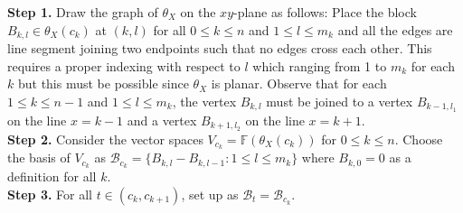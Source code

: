 \documentclass[a4paper,12pt]{article}
\newcommand{\no}{\noindent\textbf}
\begin{document}
\no{Step 1.} Draw the graph of $\theta_X$ on the $xy$-plane as follows: Place the block $B_{k,l}\in \theta_X(c_k)$ at $(k,l)$ for all $0\leq k \leq n$ and $1 \leq l \leq m_k$ and all the edges are line segment joining two endpoints such that no edges  cross each other. This requires a proper indexing with respect to $l$ which ranging from 1 to $m_k$ for each $k$ but this must be possible since $\theta_X$ is planar. Observe that for each $1\leq k\leq n-1$ and $1\leq l \leq m_k$, the vertex $B_{k,l}$ must be joined to a vertex $B_{k-1, l_1}$ on the line $x=k-1$ and a vertex $B_{k+1, l_2}$ on the line $x=k+1$.\\

\no{Step 2.} Consider the vector spaces $V_{c_k}=\mathbb{F}(\theta_X(c_k))$ for $0\leq k \leq n$. Choose the basis of $V_{c_k}$ as $\mathcal{B}_{c_k}=\{B_{k,l}-B_{k,l-1}:1\leq l \leq m_k\}$ where $B_{k,0}=0$ as a definition for all $k$.\\ 

\no{Step 3.} For all $t\in (c_k,c_{k+1})$, set up as $\mathcal{B}_{t}=\mathcal{B}_{c_k}$.\\
\end{document}
